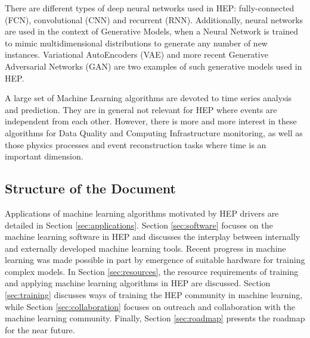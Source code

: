 There are different types of deep neural networks used in HEP: fully-connected (FCN), convolutional (CNN) and recurrent (RNN). Additionally, neural networks are used in the context of Generative Models, when a Neural Network is trained to mimic multidimensional distributions to generate any number of new instances. Variational AutoEncoders (VAE) and more recent Generative Adversarial Networks (GAN) are two examples of such generative models used in HEP.

A large set of Machine Learning algorithms are devoted to time series analysis and prediction. They are in general not relevant for HEP where events are independent from each other. However, there is more and more interest in these algorithms for Data Quality and Computing Infrastructure monitoring, as well as those physics processes and event reconstruction tasks where time is an important dimension.


\subsection{Structure of the Document}


Applications of machine learning algorithms motivated by HEP drivers are detailed in Section \ref{sec:applications}. Section \ref{sec:software} focuses on the machine learning software in HEP and discusses the interplay between internally and externally developed machine learning tools. Recent progress in machine learning was made possible in part by emergence of suitable hardware for training complex models. In Section \ref{sec:resources}, the resource requirements of training and applying machine learning algorithms in HEP are discussed. Section \ref{sec:training} discusses ways of training the HEP community in machine learning, while Section \ref{sec:collaboration} focuses on outreach and collaboration with the machine learning community. Finally, Section \ref{sec:roadmap} presents the roadmap for the near future.


